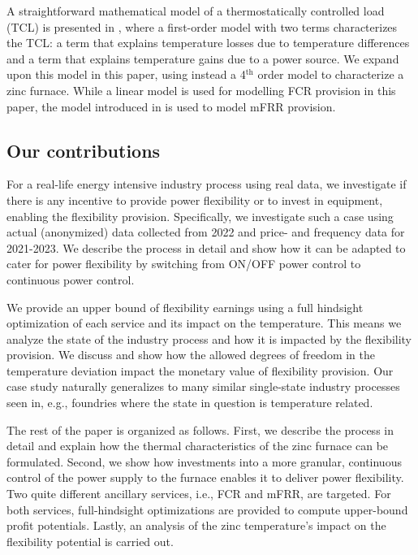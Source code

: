 \documentclass[conference]{IEEEtran}
\begin{document}
A straightforward mathematical model of a thermostatically controlled load (TCL) is presented in  \cite{hao2014aggregate}, where a first-order model with two terms characterizes the TCL: a term that explains temperature losses due to temperature differences and a term that explains temperature gains due to a power source. We expand upon this model in this paper, using instead a 4$^{\text{th}}$ order model to characterize a zinc furnace. While a linear model is used for modelling FCR provision in this paper, the model introduced in \cite{gade2023load} is used to model mFRR provision.



\subsection{Our contributions}

For a real-life energy intensive industry process using real data, we investigate if there is any incentive to provide power flexibility or to invest in equipment, enabling the flexibility provision.
%
Specifically, we investigate such a case using actual (anonymized) data collected from 2022 and price- and frequency data for 2021-2023. We describe the process in detail and show how it can be adapted to cater for power flexibility by switching from ON/OFF power control to continuous power control.

We provide an upper bound of flexibility earnings using a full hindsight optimization of each service and its impact on the temperature. This means we analyze the state of the industry process and how it is impacted by the flexibility provision. We discuss and show how the allowed degrees of freedom in the temperature deviation impact the monetary value of flexibility provision.
Our case study naturally generalizes to many similar single-state industry processes seen in, e.g., foundries where the state in question is temperature related.


The rest of the paper is organized as follows. First, we describe the process in detail and explain how the thermal characteristics of the zinc furnace can be formulated. Second, we show how investments into a more granular, continuous control of the power supply to the furnace enables it to deliver power flexibility. Two quite different ancillary services, i.e., FCR and mFRR, are targeted. For both services, full-hindsight optimizations are provided to compute upper-bound profit potentials. Lastly, an analysis of the zinc temperature's impact on the flexibility potential is carried out.
\end{document}
